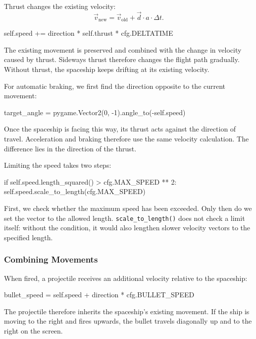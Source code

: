 Thrust changes the existing velocity:
\[
\vec v_{\mathrm{new}}
=
\vec v_{\mathrm{old}}
+
\vec d \cdot a \cdot \Delta t.
\]

\begin{codebox}
	self.speed += direction * self.thrust * cfg.DELTATIME
\end{codebox}

The existing movement is preserved and combined with the change in velocity caused by thrust. Sideways thrust therefore changes the flight path gradually. Without thrust, the spaceship keeps drifting at its existing velocity.

For automatic braking, we first find the direction opposite to the current movement:

\begin{codebox}
	target_angle = pygame.Vector2(0, -1).angle_to(-self.speed) %
\end{codebox}

Once the spaceship is facing this way, its thrust acts against the direction of travel. Acceleration and braking therefore use the same velocity calculation. The difference lies in the direction of the thrust.

Limiting the speed takes two steps:

\begin{codebox}
if self.speed.length_squared() > cfg.MAX_SPEED ** 2:
    self.speed.scale_to_length(cfg.MAX_SPEED)
\end{codebox}

First, we check whether the maximum speed has been exceeded. Only then do we set the vector to the allowed length. \texttt{scale\_to\_length()} does not check a limit itself: without the condition, it would also lengthen slower velocity vectors to the specified length.

\subsubsection*{Combining Movements}

When fired, a projectile receives an additional velocity relative to the spaceship:

\begin{codebox}
	bullet_speed = self.speed + direction * cfg.BULLET_SPEED
\end{codebox}

The projectile therefore inherits the spaceship's existing movement. If the ship is moving to the right and fires upwards, the bullet travels diagonally up and to the right on the screen.

